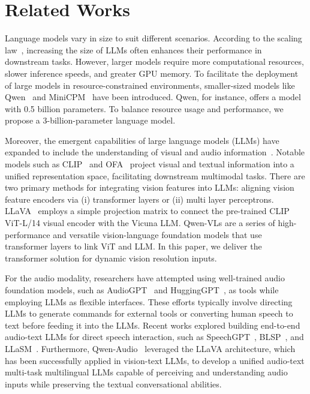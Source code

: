 \section{Related Works}

Language models vary in size to suit different scenarios. According to the scaling law~\cite{kaplan2020scaling}, increasing the size of LLMs often enhances their performance in downstream tasks. However, larger models require more computational resources, slower inference speeds, and greater GPU memory. To facilitate the deployment of large models in resource-constrained environments, smaller-sized models like Qwen~\cite{bai2023qwen, chu2023qwen, yang2024qwen2} and MiniCPM~\cite{hu2024minicpm} have been introduced. Qwen, for instance, offers a model with 0.5 billion parameters. To balance resource usage and performance, we propose a 3-billion-parameter language model. 


Moreover, the emergent capabilities of large language models (LLMs) have expanded to include the understanding of visual and audio information~\cite{flamingo, chen2022pali, li2023blip, huang2023language, peng2023kosmos, zhu2023minigpt, ye2023mplug, chen2023shikra, zhang2023video, sun2023generative}. Notable models such as CLIP~\cite{clip} and OFA~\cite{wang2022ofa} project visual and textual information into a unified representation space, facilitating downstream multimodal tasks. 
There are two primary methods for integrating vision features into LLMs: aligning vision feature encoders via (i) transformer layers or (ii) multi layer perceptrons. LLaVA~\cite{liu2023improvedllava, liu2024llavanext, liu2023llava} employs a simple projection matrix to connect the pre-trained CLIP ViT-L/14 visual encoder with the Vicuna LLM. Qwen-VLs are a series of high-performance and versatile vision-language foundation models that use transformer layers to link ViT and LLM. In this paper, we deliver the transformer solution for dynamic vision resolution inputs.

For the audio modality, researchers have attempted using well-trained audio foundation models, such as AudioGPT~\cite{huang2024audiogpt} and HuggingGPT~\cite{shen2024hugginggpt}, as tools while employing LLMs as flexible interfaces. These efforts typically involve directing LLMs to generate commands for external tools or converting human speech to text before feeding it into the LLMs. Recent works explored building end-to-end audio-text LLMs for direct speech interaction, such as SpeechGPT~\cite{zhang2023speechgpt}, BLSP~\cite{wang2024blspbootstrappinglanguagespeechpretraining}, and LLaSM~\cite{shu2023llasm}. Furthermore, Qwen-Audio~\cite{chu2023qwen} leveraged the LLaVA architecture, which has been successfully applied in vision-text LLMs, to develop a unified audio-text multi-task multilingual LLMs capable of perceiving and understanding audio inputs while preserving the textual conversational abilities.  

